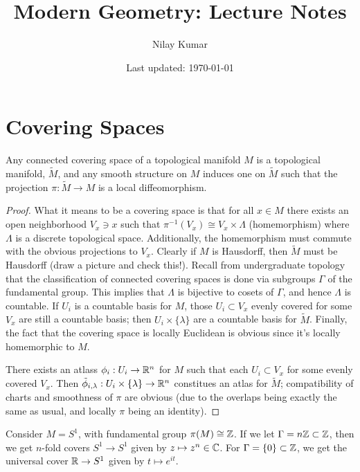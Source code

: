 \documentclass{../mathnotes}
\title{Modern Geometry: Lecture Notes}
\author{Nilay Kumar}
\date{Last updated: \today}
\begin{document}
\maketitle


\section{Covering Spaces}

\begin{thm}
    Any connected covering space of a topological manifold $M$ is a topological manifold, $\tilde M$, and any smooth structure
    on $M$ induces one on $\tilde M$ such that the projection $\pi:\tilde M\to M$ is a local diffeomorphism.
\end{thm}
\begin{proof}
    What it means to be a covering space is that for all $x\in M$ there exists an open neighborhood $V_x\ni x$ such that
    $\pi^{-1}(V_x)\cong V_x\times\Lambda$ (homemorphism) where $\Lambda$ is a discrete topological space. Additionally, the homemorphism
    must commute with the obvious projections to $V_x$. Clearly if $M$ is Hausdorff, then $\tilde M$ must be Hausdorff (draw a picture and check this!).
    Recall from undergraduate topology that the classification of connected covering spaces is done via subgroups $\Gamma$ of the fundamental group.
    This implies that $\Lambda$ is bijective to cosets of $\Gamma$, and hence $\Lambda$ is countable.
    If $U_i$ is a countable basis for $M$, those $U_i\subset V_x$ evenly covered for some $V_x$ are still a countable basis; then $U_i\times\{\lambda\}$
    are a countable basis for $\tilde M$. Finally, the fact that the covering space is locally Euclidean is obvious since it's locally homemorphic to $M$.

    There exists an atlass $\phi_i:U_i\to\mathbb{R}^n$ for $M$ such that each $U_i\subset V_x$ for some evenly covered $V_x$. Then $\tilde\phi_{i,\lambda}:U_i\times\{\lambda\}\to\mathbb{R}^n$
    constitues an atlas for $\tilde M$; compatibility of charts and smoothness of $\pi$ are obvious (due to the overlaps being exactly the same as usual, and locally $\pi$
    being an identity).
\end{proof}

\begin{exmp}
    Consider $M=S^1$, with fundamental group $\pi(M)\cong\mathbb{Z}$. If we let $\Gamma=n\mathbb{Z}\subset\mathbb{Z}$, then we get $n$-fold covers
    $S^1\to S^1$ given by $z\mapsto z^n\in\mathbb{C}$. For $\Gamma=\{0\}\subset\mathbb{Z}$, we get the universal cover $\mathbb{R}\to S^1$ given by
    $t\mapsto e^{it}$.
\end{exmp}
\end{document}
